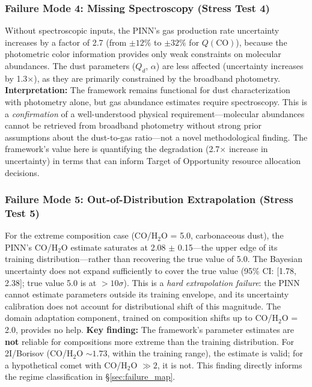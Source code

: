 \documentclass[usenatbib]{mnras}
\begin{document}
\subsubsection{Failure Mode 4: Missing Spectroscopy (Stress Test 4)}

Without spectroscopic inputs, the PINN's gas production rate uncertainty increases by a factor of 2.7 (from $\pm 12\%$ to $\pm 32\%$ for $Q(\text{CO})$), because the photometric color information provides only weak constraints on molecular abundances. The dust parameters ($Q_d$, $\alpha$) are less affected (uncertainty increases by 1.3$\times$), as they are primarily constrained by the broadband photometry. \textbf{Interpretation:} The framework remains functional for dust characterization with photometry alone, but gas abundance estimates require spectroscopy. This is a \textit{confirmation} of a well-understood physical requirement---molecular abundances cannot be retrieved from broadband photometry without strong prior assumptions about the dust-to-gas ratio---not a novel methodological finding. The framework's value here is quantifying the degradation (2.7$\times$ increase in uncertainty) in terms that can inform Target of Opportunity resource allocation decisions.

\subsubsection{Failure Mode 5: Out-of-Distribution Extrapolation (Stress Test 5)}

For the extreme composition case (CO/H$_2$O = 5.0, carbonaceous dust), the PINN's CO/H$_2$O estimate saturates at 2.08 $\pm$ 0.15---the upper edge of its training distribution---rather than recovering the true value of 5.0. The Bayesian uncertainty does not expand sufficiently to cover the true value (95\% CI: [1.78, 2.38]; true value 5.0 is at $>10\sigma$). This is a \textit{hard extrapolation failure}: the PINN cannot estimate parameters outside its training envelope, and its uncertainty calibration does not account for distributional shift of this magnitude. The domain adaptation component, trained on composition shifts up to CO/H$_2$O = 2.0, provides no help. \textbf{Key finding:} The framework's parameter estimates are \textbf{not} reliable for compositions more extreme than the training distribution. For 2I/Borisov (CO/H$_2$O $\sim 1.73$, within the training range), the estimate is valid; for a hypothetical comet with CO/H$_2$O $\gg 2$, it is not. This finding directly informs the regime classification in \S\ref{sec:failure_map}.
\end{document}
